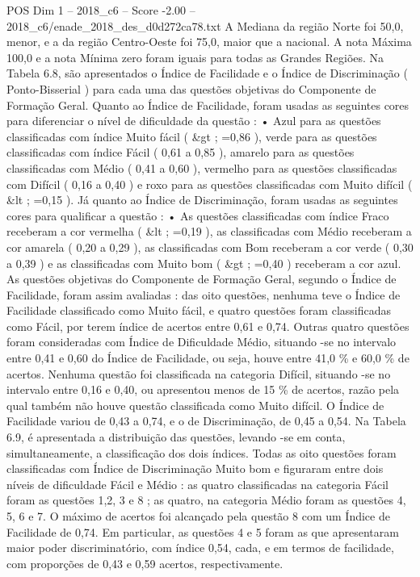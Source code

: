 \begin{textsample}{POS Dim 1 – 2018\_c6 – Score -2.00 – 2018\_c6/enade\_2018\_des\_d0d272ca78.txt}
A Mediana da região Norte foi 50,0, menor, e a da região Centro-Oeste foi 75,0, maior que a nacional.
A nota Máxima 100,0 e a nota Mínima zero foram iguais para todas as Grandes Regiões.
Na Tabela 6.8, são apresentados o Índice de Facilidade e o Índice de Discriminação ( Ponto-Bisserial ) para cada uma das questões objetivas do Componente de Formação Geral.
Quanto ao Índice de Facilidade, foram usadas as seguintes cores para diferenciar o nível de dificuldade da questão : • Azul para as questões classificadas com índice Muito fácil ( \&gt ; =0,86 ), verde para as questões classificadas com índice Fácil ( 0,61 a 0,85 ), amarelo para as questões classificadas com Médio ( 0,41 a 0,60 ), vermelho para as questões classificadas com Difícil ( 0,16 a 0,40 ) e roxo para as questões classificadas com Muito difícil ( \&lt ; =0,15 ).
Já quanto ao Índice de Discriminação, foram usadas as seguintes cores para qualificar a questão : • As questões classificadas com índice Fraco receberam a cor vermelha ( \&lt ; =0,19 ), as classificadas com Médio receberam a cor amarela ( 0,20 a 0,29 ), as classificadas com Bom receberam a cor verde ( 0,30 a 0,39 ) e as classificadas com Muito bom ( \&gt ; =0,40 ) receberam a cor azul.
As questões objetivas do Componente de Formação Geral, segundo o Índice de Facilidade, foram assim avaliadas : das oito questões, nenhuma teve o Índice de Facilidade classificado como Muito fácil, e quatro questões foram classificadas como Fácil, por terem índice de acertos entre 0,61 e 0,74.
Outras quatro questões foram consideradas com Índice de Dificuldade Médio, situando -se no intervalo entre 0,41 e 0,60 do Índice de Facilidade, ou seja, houve entre 41,0 \% e 60,0 \% de acertos.
Nenhuma questão foi classificada na categoria Difícil, situando -se no intervalo entre 0,16 e 0,40, ou apresentou menos de 15 \% de acertos, razão pela qual também não houve questão classificada como Muito difícil.
O Índice de Facilidade variou de 0,43 a 0,74, e o de Discriminação, de 0,45 a 0,54.
Na Tabela 6.9, é apresentada a distribuição das questões, levando -se em conta, simultaneamente, a classificação dos dois índices.
Todas as oito questões foram classificadas com Índice de Discriminação Muito bom e figuraram entre dois níveis de dificuldade Fácil e Médio : as quatro classificadas na categoria Fácil foram as questões 1,2, 3 e 8 ; as quatro, na categoria Médio foram as questões 4, 5, 6 e 7.
O máximo de acertos foi alcançado pela questão 8 com um Índice de Facilidade de 0,74.
Em particular, as questões 4 e 5 foram as que apresentaram maior poder discriminatório, com índice 0,54, cada, e em termos de facilidade, com proporções de 0,43 e 0,59 acertos, respectivamente.

\end{textsample}
